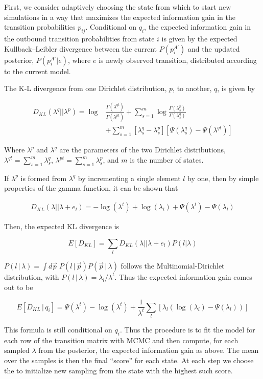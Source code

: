 \documentclass[twocolumn,floatfix,nofootinbib,aps]{revtex4-1}
\renewcommand{\vert}{\, | \,}
\begin{document}
First, we consider adaptively choosing the state from which to start new simulations in a way that maximizes the expected information gain in the transition probabilities $p_{ij}$. Conditional on $q_i$, the expected information gain in the outbound transition probabilities from state $i$ is given by the expected Kullback–Leibler divergence between the current
$P(p_i^{A'})$ and the updated posterior, $P(p_i^{A'} | e)$, where $e$ is newly observed transition, distributed according to the current model.

The K-L divergence from one Dirichlet distribution, $p$, to another, $q$, is given by

\begin{align*}
D_{KL}(\lambda^q || \lambda^p) = \log& \frac{\Gamma(\lambda^{qt})}{\Gamma(\lambda^{pt})} + \sum_{s=1}^m \log \frac{\Gamma(\lambda^p_s)}{\Gamma(\lambda^q_s)} \\
&+ \sum_{s=1}^m \left[\lambda^q_s -\lambda^p_s\right]\left[\Psi(\lambda^q_s) - \Psi(\lambda^{qt})\right]
\end{align*}

Where $\lambda^p$ and $\lambda^q$ are the parameters of the two Dirichlet distributions, $\lambda^{qt} = \sum_{s=1}^{m}\lambda^q_s$, $\lambda^{pt} = \sum_{s=1}^{m}\lambda^p_s$, and $m$ is the number of states.

If $\lambda^p$ is formed from $\lambda^q$ by incrementing a single element $l$  by one, then by simple properties of the gamma function, it can be shown that

\begin{align*}
D_{KL}(\lambda || \lambda + e_l) = - \log(\lambda^t) + \log(\lambda_l) + \Psi(\lambda^{t}) - \Psi(\lambda_l)
\end{align*}

Then, the expected KL divergence is 

$$
E[D_{KL}] = \sum_l D_{KL}(\lambda || \lambda + e_l) P(l | \lambda)
$$

$P(l \vert \lambda) = \int d \vec{p} \; P(l \vert \vec{p}) P(\vec{p} \vert \lambda)$ follows the Multinomial-Dirichlet distribution, with $P(l \vert \lambda) = \lambda_l / \lambda^t$. Thus the expected information gain comes out to be

$$
E[D_{KL} \vert q_i] = \Psi(\lambda^t) - \log(\lambda^t) + \frac{1}{\lambda^t} \sum_l \left[ \lambda_l \left( \log (\lambda_l) - \Psi(\lambda_l) \right) \right] 
$$

This formula is still conditional on $q_i$. Thus the procedure is to fit the model for each row of the transition matrix with MCMC and then compute, for each sampled $\lambda$ from the posterior, the expected information gain as above. The mean over the samples is then the final ``score'' for each state. At each step we choose the to initialize new sampling from the state with the highest such score.
\end{document}
